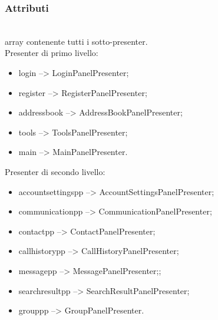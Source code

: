 \subsubsection*{Attributi}
\begin{description}
\item{}\\
  array contenente tutti i sotto-presenter.\\
  Presenter di primo livello:
  \begin{itemize}
  \item login --> LoginPanelPresenter;
  \item register --> RegisterPanelPresenter;
  \item addressbook --> AddressBookPanelPresenter;
  \item tools --> ToolsPanelPresenter;
  \item main --> MainPanelPresenter.
  \end{itemize}
  Presenter di secondo livello:
  \begin{itemize}
  \item accountsettingspp --> AccountSettingsPanelPresenter;
  \item communicationpp --> CommunicationPanelPresenter;
  \item contactpp --> ContactPanelPresenter;
  \item callhistorypp --> CallHistoryPanelPresenter;
  \item messagepp --> MessagePanelPresenter;;
  \item searchresultpp --> SearchResultPanelPresenter;
  \item grouppp --> GroupPanelPresenter.
  \end{itemize}
\end{description}

